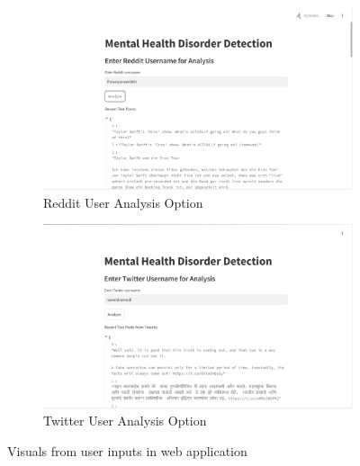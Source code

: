 \begin{figure}[H]
    \begin{subfigure}[b]{0.495\textwidth}
        \centering
        \includegraphics[width=\textwidth]{App Images/06 Interface.png}
        \caption{Reddit User Analysis Option}
        \label{fig:07i}
    \end{subfigure}
    \hfill
    \begin{subfigure}[b]{0.495\textwidth}
        \centering
        \includegraphics[width=\textwidth]{App Images/08 Interface.png}
        \caption{Twitter User Analysis Option}
        \label{fig:09i}
    \end{subfigure}
    \caption{Visuals from user inputs in web application}
    \label{fig:reddit_twitter_analysis}
\end{figure}

\pagebreak

